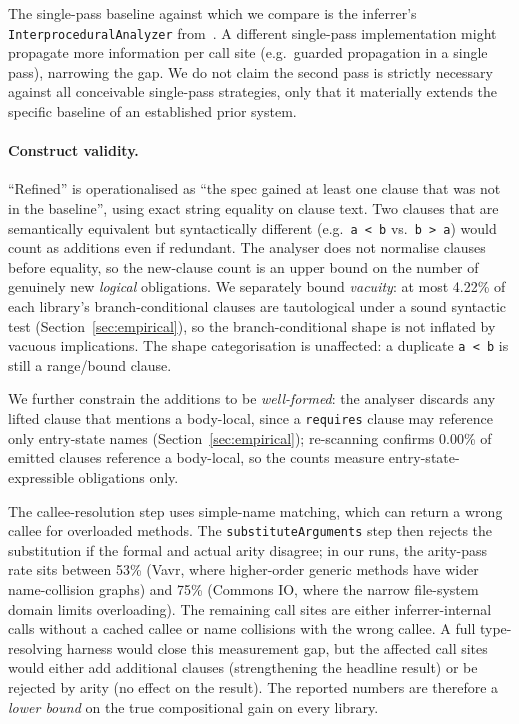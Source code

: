 The single-pass baseline against which we compare is the inferrer's
\texttt{InterproceduralAnalyzer} from~\cite{edmonds2026inference}.
A different single-pass implementation might propagate more
information per call site (e.g.\ guarded propagation in a single
pass), narrowing the gap. We do not claim the second pass is
strictly necessary against all conceivable single-pass strategies,
only that it materially extends the specific baseline of an
established prior system.

\paragraph{Construct validity.}
``Refined'' is operationalised as ``the spec gained at least one
clause that was not in the baseline'', using exact string equality
on clause text. Two clauses that are semantically equivalent but
syntactically different (e.g.\ \texttt{a < b} vs.\ \texttt{b > a})
would count as additions even if redundant. The analyser does not
normalise clauses before equality, so the new-clause count is an
upper bound on the number of genuinely new \emph{logical}
obligations. We separately bound \emph{vacuity}: at most 4.22\% of
each library's branch-conditional clauses are tautological under a
sound syntactic test (Section~\ref{sec:empirical}), so the
branch-conditional shape is not inflated by vacuous implications. The
shape categorisation is unaffected: a duplicate \texttt{a < b} is
still a range/bound clause.

We further constrain the additions to be \emph{well-formed}: the
analyser discards any lifted clause that mentions a body-local, since
a \texttt{requires} clause may reference only entry-state names
(Section~\ref{sec:empirical}); re-scanning confirms 0.00\% of emitted
clauses reference a body-local, so the counts measure
entry-state-expressible obligations only.

The callee-resolution step uses simple-name matching, which can
return a wrong callee for overloaded methods. The
\texttt{substituteArguments} step then rejects the substitution if
the formal and actual arity disagree; in our runs, the arity-pass
rate sits between 53\% (Vavr, where higher-order generic methods
have wider name-collision graphs) and 75\% (Commons IO, where the
narrow file-system domain limits overloading). The remaining call
sites are either inferrer-internal calls without a cached callee or
name collisions with the wrong callee. A full type-resolving
harness would close this measurement gap, but the affected call
sites would either add additional clauses (strengthening the
headline result) or be rejected by arity (no effect on the result).
The reported numbers are therefore a \emph{lower bound} on the
true compositional gain on every library.

